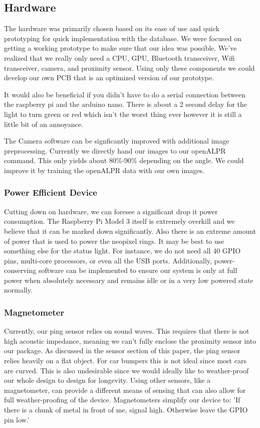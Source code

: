 \subsection{Hardware}
The hardware was primarily chosen based on its ease of use and quick prototyping for quick implementation with the database.
We were focused on getting a working prototype to make sure that our idea was possible. 
We've realized that we really only need a CPU, GPU, Bluetooth transceiver, Wifi transceiver, camera, and proximity sensor. 
Using only these components we could develop our own PCB that is an optimized version of our prototype. 

It would also be beneficial if you didn't have to do a serial connection between the raspberry pi and the arduino nano. There is about a 2 second delay for the light to turn green or red which isn't the worst thing ever however it is still a little bit of an annoyance. 

The Camera software can be signficantly improved with additional image preprocessing. Currently we directly hand our images to our openALPR command. This only yields about 80\%-90\% depending on the angle. We could improve it by training the openALPR data with our own images.

\subsubsection{Power Efficient Device}
Cutting down on hardware, we can foresee a significant drop it power consumption. 
The Raspberry Pi Model 3 itself is extremely overkill and we believe that it can be marked down significantly.
Also there is an extreme amount of power that is used to power the neopixel rings. It may be best to use something else for the status light. 
For instance, we do not need all 40 GPIO pins, multi-core processors, or even all the USB ports.
Additionally, power-conserving software can be implemented to ensure our system is only at full power when absolutely necessary and remains idle or in a very low powered state normally.

\subsubsection{Magnetometer}
Currently, our ping sensor relies on sound waves. 
This requires that there is not high acoustic impedance, meaning we can't fully enclose the proximity sensor into our package. 
As discussed in the sensor section of this paper, the ping sensor relies heavily on a flat object.
For car bumpers this is not ideal since most cars are curved.
This is also undesirable since we would ideally like to weather-proof our whole design to design for longevity. 
Using other sensors, like a magnetometer, can provide a different means of sensing that can also allow for full weather-proofing of the device.
Magnetometers simplify our device to: 
'If there is a chunk of metal in front of me, signal high. 
Otherwise leave the GPIO pin low.'

